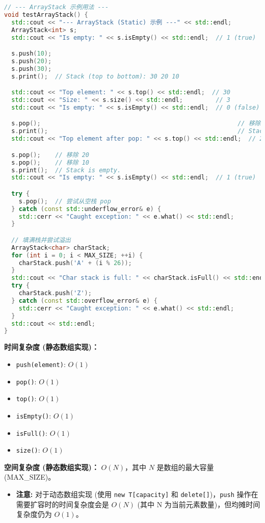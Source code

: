 \begin{lstlisting}[language=C++]
// --- ArrayStack 示例用法 ---
void testArrayStack() {
  std::cout << "--- ArrayStack (Static) 示例 ---" << std::endl;
  ArrayStack<int> s;
  std::cout << "Is empty: " << s.isEmpty() << std::endl;  // 1 (true)

  s.push(10);
  s.push(20);
  s.push(30);
  s.print();  // Stack (top to bottom): 30 20 10

  std::cout << "Top element: " << s.top() << std::endl;  // 30
  std::cout << "Size: " << s.size() << std::endl;         // 3
  std::cout << "Is empty: " << s.isEmpty() << std::endl;  // 0 (false)

  s.pop();                                                      // 移除 30
  s.print();                                                    // Stack (top to bottom): 20 10
  std::cout << "Top element after pop: " << s.top() << std::endl;  // 20

  s.pop();    // 移除 20
  s.pop();    // 移除 10
  s.print();  // Stack is empty.
  std::cout << "Is empty: " << s.isEmpty() << std::endl;  // 1 (true)

  try {
    s.pop();  // 尝试从空栈 pop
  } catch (const std::underflow_error& e) {
    std::cerr << "Caught exception: " << e.what() << std::endl;
  }

  // 填满栈并尝试溢出
  ArrayStack<char> charStack;
  for (int i = 0; i < MAX_SIZE; ++i) {
    charStack.push('A' + (i % 26));
  }
  std::cout << "Char stack is full: " << charStack.isFull() << std::endl;
  try {
    charStack.push('Z');
  } catch (const std::overflow_error& e) {
    std::cerr << "Caught exception: " << e.what() << std::endl;
  }
  std::cout << std::endl;
}
\end{lstlisting}
\textbf{时间复杂度 (静态数组实现)：}

\begin{itemize}
	\item \lstinline{push(element)}: $O(1)$
	\item \lstinline{pop()}: $O(1)$
	\item \lstinline{top()}: $O(1)$
	\item \lstinline{isEmpty()}: $O(1)$
	\item \lstinline{isFull()}: $O(1)$
	\item \lstinline{size()}: $O(1)$
\end{itemize}

\textbf{空间复杂度 (静态数组实现)：} $O(N)$，其中 $N$ 是数组的最大容量 (MAX\_SIZE)。

\begin{itemize}
	\item \textbf{注意:} 对于动态数组实现 (使用 \lstinline{new T[capacity]} 和 \lstinline{delete[]})，\lstinline{push} 操作在需要扩容时的时间复杂度会是 $O(N)$ (其中 N 为当前元素数量)，但均摊时间复杂度仍为 $O(1)$。
\end{itemize}

